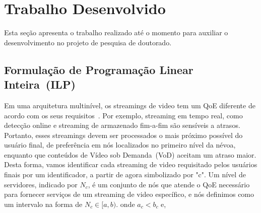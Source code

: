 \clearpage
\section{Trabalho Desenvolvido}
\label{ch:developed}

Esta seção apresenta o trabalho realizado até o momento para auxiliar o desenvolvimento 
no projeto de pesquisa de doutorado. 



%

\subsection{Formulação de Programação Linear Inteira~(ILP)}
\label{subsec:applications}

Em uma arquitetura multinível, os streamings de video tem um QoE diferente de acordo com os seus requisitos~\cite{judyLATINCOM2017}. Por exemplo, streaming em tempo real, como detecção online e streaming de armazenado fim-a-fim são sensíveis a atrasos. Portanto, esses streamings devem ser processados o mais próximo possível do usuário final, de preferência em nós localizados no primeiro nível da névoa, enquanto que conteúdos de Vídeo sob Demanda~(VoD) aceitam um atraso maior. Desta forma, vamos identificar cada streaming de video requisitado pelos usuários finais por um identificador, a partir de agora simbolizado por "c".
Um nível de servidores, indicado por $N_{c}$, é um conjunto de nós que atende o QoE necessário para fornecer serviços de um streaming de video específico, e nós definimos como um intervalo na forma de $N_{c} \in [a, b)$. onde $a_{c} < b_{c}$ e,

